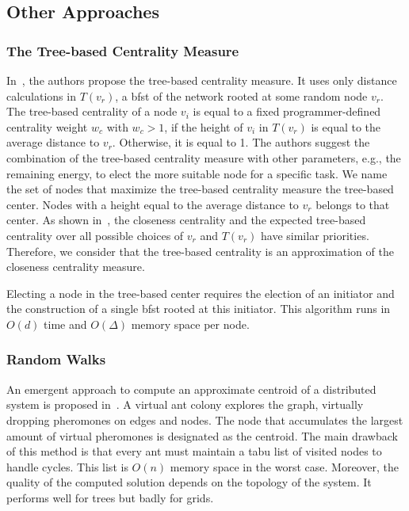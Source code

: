 \subsection{Other Approaches}

\subsubsection{The Tree-based Centrality Measure}

In~\cite{kim2013leader}, the authors propose the tree-based centrality measure. It uses only distance calculations in $T(v_r)$, a \gls{bfst} of the network rooted at some random node $v_r$. The tree-based centrality of a node $v_i$ is equal to a fixed programmer-defined centrality weight $w_{c}$ with $w_{c} > 1$, if the height of $v_i$ in $T(v_r)$ is equal to the average distance to $v_r$. Otherwise, it is equal to 1. The authors suggest the combination of the tree-based centrality measure with other parameters, e.g., the remaining energy, to elect the more suitable node for a specific task. We name the set of nodes that maximize the tree-based centrality measure the tree-based center. Nodes with a height equal to the average distance to $v_r$ belongs to that center. As shown in~\cite{kim2013leader}, the closeness centrality and the expected tree-based centrality over all possible choices of $v_r$ and $T(v_r)$ have similar priorities. Therefore, we consider that the tree-based centrality is an approximation of the closeness centrality measure.

Electing a node in the tree-based center requires the election of an initiator and the construction of a single \gls{bfst} rooted at this initiator. This algorithm runs in $O(d)$ time and $O(\Delta)$ memory space per node.

\subsubsection{Random Walks}
An emergent approach to compute an approximate centroid of a distributed system is proposed in~\cite{dutot:hal-00742845}. A virtual ant colony explores the graph, virtually dropping pheromones on edges and nodes. The node that accumulates the largest amount of virtual pheromones is designated as the centroid. The main drawback of this method is that every ant must maintain a tabu list of visited nodes to handle cycles. This list is $O(n)$ memory space in the worst case. Moreover, the quality of the computed solution depends on the topology of the system. It performs well for trees but badly for grids.

